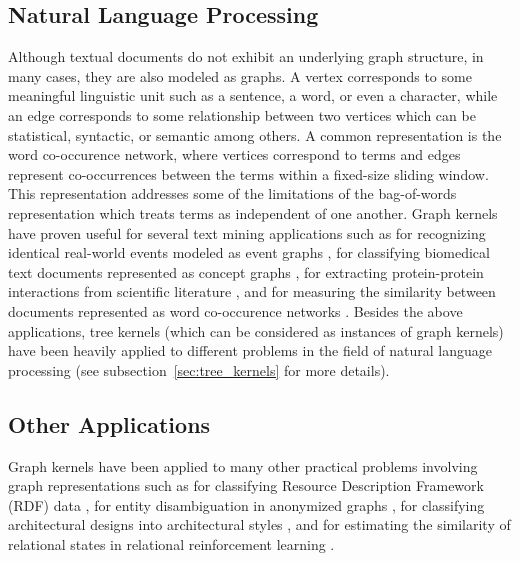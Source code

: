 \documentclass[twoside,11pt]{article}
\begin{document}
\subsection{Natural Language Processing}
Although textual documents do not exhibit an underlying graph structure, in many cases, they are also modeled as graphs.
A vertex corresponds to some meaningful linguistic unit such as a sentence, a word, or even a character, while an edge corresponds to some relationship between two vertices which can be statistical, syntactic, or semantic among others.
A common representation is the word co-occurence network, where vertices correspond to terms and edges represent co-occurrences between the terms within a fixed-size sliding window.
This representation addresses some of the limitations of the bag-of-words representation which treats terms as independent of one another.
Graph kernels have proven useful for several text mining applications such as for recognizing identical real-world events modeled as event graphs , for classifying biomedical text documents represented as concept graphs , for extracting protein-protein interactions from scientific literature , and for measuring the similarity between documents represented as word co-occurence networks .
Besides the above applications, tree kernels (which can be considered as instances of graph kernels) have been heavily applied to different problems in the field of natural language processing (see subsection~\ref{sec:tree_kernels} for more details).

\subsection{Other Applications}
Graph kernels have been applied to many other practical problems involving graph representations such as for classifying Resource Description Framework (RDF) data , for entity disambiguation in anonymized graphs , for classifying architectural designs into architectural styles , and for estimating the similarity of relational states in relational reinforcement learning .
\end{document}
